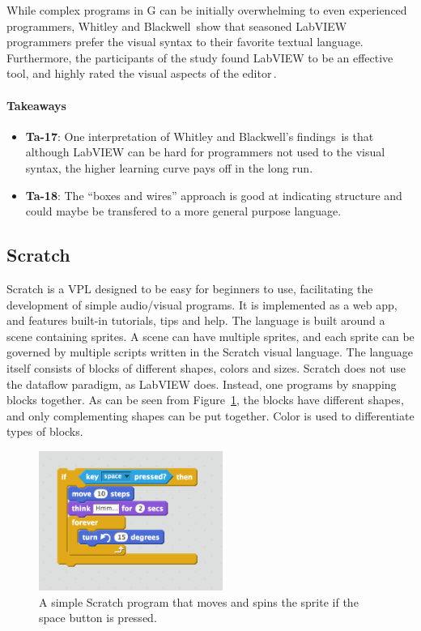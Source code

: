 While complex programs in G can be initially overwhelming to even experienced programmers, Whitley and Blackwell\,\cite[p. 445]{WHITLEY2001435} show that seasoned LabVIEW programmers prefer the visual syntax to their favorite textual language. Furthermore, the participants of the study found LabVIEW to be an effective tool, and highly rated the visual aspects of the
editor\,\cite[pp.
466]{WHITLEY2001435}.

\paragraph{Takeaways}
\begin{itemize}
	\item \textbf{Ta-17}: One interpretation of Whitley and Blackwell's findings\,\cite{WHITLEY2001435} is that although LabVIEW can be hard for programmers not used to the visual syntax, the higher learning curve pays off in the long run.
	\item \textbf{Ta-18}: The ``boxes and wires'' approach is good at indicating structure and could maybe be transfered to a more general purpose language.
\end{itemize}


\subsection{Scratch}
\label{subsub:Scratch}
Scratch is a VPL designed to be easy for beginners to use, facilitating the development of simple audio/visual programs. It is implemented as a web app, and features built-in tutorials, tips and help.
The language is built around a scene containing sprites. A scene can have multiple sprites, and each sprite can be governed by multiple scripts written in the Scratch visual language. The language itself consists of blocks of different shapes, colors and sizes. Scratch does not use the dataflow paradigm, as LabVIEW does. Instead, one programs by snapping blocks together. As can be seen from Figure~\ref{fig:ScratchProgram}, the blocks have different shapes, and only complementing shapes can be put together. Color is used to differentiate types of blocks.

\begin{figure}
	\centering
		\includegraphics[width=60mm]{diagrams/ScratchProgram.png}
	\caption{A simple Scratch program that moves and spins the sprite if the space button is pressed.}
\label{fig:ScratchProgram}
\end{figure}

